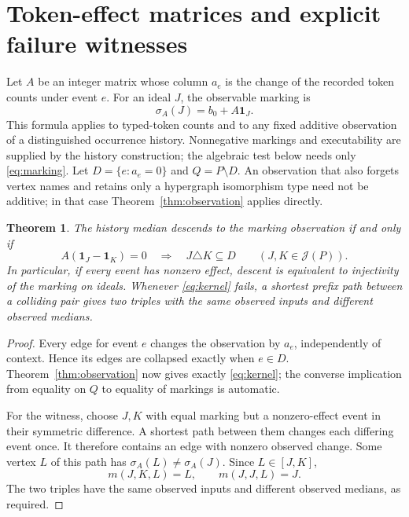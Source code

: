 \documentclass[11pt]{article}
\newtheorem{theorem}{Theorem}[section]
\theoremstyle{definition}
\newcommand{\Id}{\mathcal J}
\numberwithin{equation}{section}
\begin{document}
\section{Token-effect matrices and explicit failure witnesses}

Let $A$ be an integer matrix whose column $a_e$ is the change of
the recorded token counts under event $e$.
For an ideal $J$, the observable marking is
\begin{equation}\label{eq:marking}
 \sigma_A(J)=b_0+A\mathbf1_J.
\end{equation}
This formula applies to typed-token counts and to any fixed additive
observation of a distinguished occurrence history. Nonnegative
markings and executability are supplied by the history construction;
the algebraic test below needs only \eqref{eq:marking}.
Let $D=\{e:a_e=0\}$ and $Q=P\setminus D$.
An observation that also forgets vertex names and retains only a
hypergraph isomorphism type need not be additive; in that case
Theorem~\ref{thm:observation} applies directly.

\begin{theorem}\label{thm:matrix}
The history median descends to the marking observation if and only if
\begin{equation}\label{eq:kernel}
 A(\mathbf1_J-\mathbf1_K)=0
       \quad\Longrightarrow\quad J\triangle K\subseteq D
                 \qquad(J,K\in\Id(P)).
\end{equation}
In particular, if every event has nonzero effect, descent is
equivalent to injectivity of the marking on ideals.
Whenever \eqref{eq:kernel} fails, a shortest prefix path between
a colliding pair gives two triples with the same observed inputs
and different observed medians.
\end{theorem}
\begin{proof}
Every edge for event $e$ changes the observation by $a_e$,
independently of context. Hence its edges are collapsed exactly
when $e\in D$. Theorem~\ref{thm:observation} now gives exactly
\eqref{eq:kernel}; the converse implication from equality on $Q$
to equality of markings is automatic.

For the witness, choose $J,K$ with equal marking but a nonzero-effect
event in their symmetric difference. A shortest path between them
changes each differing event once. It therefore contains an edge
with nonzero observed change. Some vertex $L$ of this path has
$\sigma_A(L)\ne\sigma_A(J)$. Since $L\in[J,K]$,
\[
 m(J,K,L)=L,\qquad m(J,J,L)=J.
\]
The two triples have the same observed inputs and different
observed medians, as required.
\end{proof}
\end{document}
